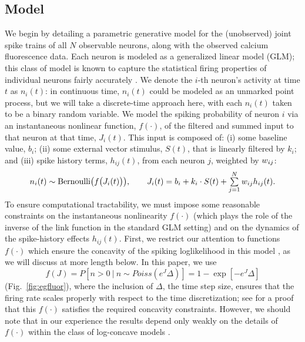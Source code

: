 \long{}

\subsection{Model} 
\label{sec:methods:markov-setup} 

We begin by detailing a parametric generative model for the
(unobserved) joint spike trains of all $N$ observable neurons, along
with the observed calcium fluorescence data. Each neuron is modeled as
a generalized linear model (GLM); this class of model is known to
capture the statistical firing properties of individual neurons fairly
accurately \cite{BRIL88,CSK88,BRIL92,PG00,PILL07,PAN03d,PAN04c,Rigat06,TRUC05,NYK06,KP06,Vidne08,Stevenson2009}. We denote the
$i$-th neuron's activity at time $t$ as $n_i(t)$: in continuous time,
$n_i(t)$ could be modeled as an unmarked point process, but we will
take a discrete-time approach here, with each $n_i(t)$ taken to be a
binary random variable.  We model the spiking probability of neuron
$i$ via an instantaneous nonlinear function, $f(\cdot)$, of the
filtered and summed input to that neuron at that time, $J_i(t)$.  This
input is composed of: (i) some baseline value, $b_i$; (ii) some
external vector stimulus, $S(t)$, that is linearly filtered by $k_i$;
and (iii) spike history terms, $h_{ij}(t)$, from each neuron $j$,
weighted by $w_{ij}$:
\begin{equation} \label{eqn:glm:definition}
\begin{array}{l}
n_i(t) \sim \text{Bernoulli}\big(f\big(J_i(t) \big) \big), \qquad
J_i(t)=b_i+k_i\cdot S(t)+\sum \limits_{j=1}^{N} \w_{ij} h_{ij}(t).
\end{array}
\end{equation}
To ensure computational tractability, we must impose some reasonable
constraints on the instantaneous nonlinearity $f(\cdot)$ (which plays
the role of the inverse of the link function in the standard GLM
setting) and on the dynamics of the spike-history effects $h_{ij}(t)$.
First, we restrict our attention to functions $f(\cdot)$ which ensure
the concavity of the spiking loglikelihood in this model
\cite{PAN04c,Escola07}, as we will discuss at more length below. In
this paper, we use \begin{equation} f(J) = P[n>0 ~|~ n \sim Poiss(e^J
\Delta)] = 1 - \exp[-e^J \Delta] \end{equation}
(Fig.~\ref{fig:egfluor}), where the inclusion of $\Delta$, the time
step size, ensures that the firing rate scales properly with respect
to the time discretization; see \cite{Escola07} for a proof that this
$f(\cdot)$ satisfies the required concavity constraints.  However, we
should note that in our experience the results depend only weakly on
the details of $f(\cdot)$ within the class of log-concave models
\cite{LD89,PAN04c}.

